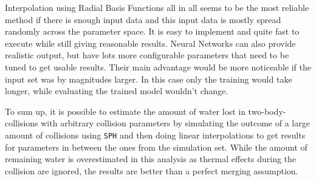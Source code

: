 Interpolation using Radial Basis Functions all in all seems to be the most reliable method if there is enough input data and this input data is mostly spread randomly across the parameter space. It is easy to implement and quite fast to execute while still giving reasonable results. Neural Networks can also provide realistic output, but have lots more configurable parameters that need to be tuned to get usable results. Their main advantage would be more noticeable if the input set was by magnitudes larger. In this case only the training would take longer, while evaluating the trained model wouldn't change.

To sum up, it is possible to estimate the amount of water lost in two-body-collisions with arbitrary collision parameters by simulating the outcome of a large amount of collisions using \texttt{SPH} and then doing linear interpolations to get results for parameters in between the ones from the simulation set. While the amount of remaining water is overestimated in this analysis as thermal effects during the collision are ignored, the results are better than a perfect merging assumption.

